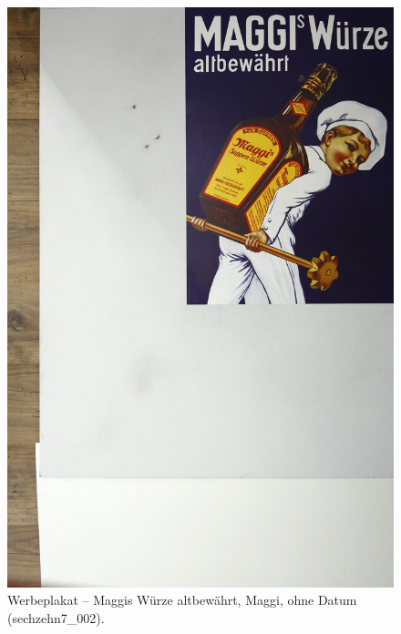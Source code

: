 \documentclass[a4paper,12pt,ngerman]{article}
\begin{document}
\newpage
\begin{figure}[ht]
\includegraphics[width=\linewidth]{Abbildung_11_(sechzehn7_002)}
\centering
\caption{Werbeplakat – Maggis Würze altbewährt, Maggi, ohne Datum (sechzehn7\_002).}
\end{figure}
\end{document}
